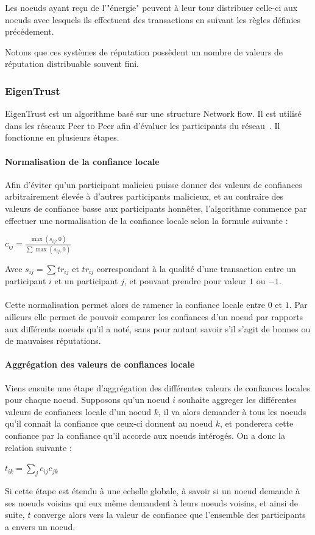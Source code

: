 \documentclass[a4paper, 11pt]{article} %
\begin{document}
Les noeuds ayant reçu de l'"énergie" peuvent à leur tour distribuer celle-ci aux noeuds avec lesquels ils effectuent des transactions en suivant les règles définies précédement.

Notons que ces systèmes de réputation possèdent un nombre de valeurs de réputation distribuable souvent fini.

\subsubsection{EigenTrust}
EigenTrust est un algorithme basé sur une structure Network flow. Il est utilisé dans les réseaux Peer to Peer afin d'évaluer les participants du réseau~\cite{KamvarSchlosserGarciaMolina2003}.
Il fonctionne en plusieurs étapes.

\paragraph{Normalisation de la confiance locale}
Afin d'éviter qu'un participant malicieu puisse donner des valeurs de confiances arbitrairement élevée à d'autres participants malicieux, et au contraire des valeurs de confiance basse aux participants honnêtes, l'algorithme commence par effectuer une normalisation de la confiance locale selon la formule suivante :
\begin{center}
	$c_{ij} = \frac{\max{(s_{ij},0)}}{\sum \max{(s_{ij},0)}}$
\end{center}
Avec $s_{ij} = \sum tr_{ij}$ et $tr_{ij}$ correspondant à la qualité d'une transaction entre un participant $i$ et un participant $j$, et pouvant prendre pour valeur $1$ ou $-1$.
\paragraph{}
Cette normalisation permet alors de ramener la confiance locale entre $0$ et $1$.
Par ailleurs elle permet de pouvoir comparer les confiances d'un noeud par rapports aux différents noeuds qu'il a noté, sans pour autant savoir s'il s'agit de bonnes ou de mauvaises réputations.

\paragraph{Aggrégation des valeurs de confiances locale}
Viens ensuite une étape d'aggrégation des différentes valeurs de confiances locales pour chaque noeud.
Supposons qu'un noeud $i$ souhaite aggreger les différentes valeurs de confiances locale d'un noeud $k$, il va alors demander à tous les noeuds qu'il connait la confiance que ceux-ci donnent au noeud $k$, et ponderera cette confiance par la confiance qu'il accorde aux noeuds intérogés.
On a donc la relation suivante :
\begin{center}
	$t_{ik} = \sum_{j} c_{ij}c_{jk}$
\end{center}
Si cette étape est étendu à une echelle globale, à savoir si un noeud demande à ses noeuds voisins qui eux même demandent à leurs noeuds voisins, et ainsi de suite, $t$ converge alors vers la valeur de confiance que l'ensemble des participants a envers un noeud.
\end{document}
